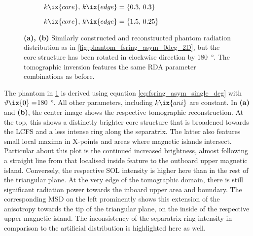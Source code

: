                 \begin{figure}[t]%
                    \centering%
                    \begin{subfigure}{\textwidth}%
                        \centering%
                        \caption{$k\ix{core},\,k\ix{edge}=\left\{0.3,\,0.3\right\}$}%
                    \end{subfigure}%
                    \newline%
                    \begin{subfigure}{\textwidth}%
                        \centering%
                        \caption{$k\ix{core},\,k\ix{edge}=\left\{1.5,\,0.25\right\}$}%
                    \end{subfigure}%
                    \caption{\textbf{(a), (b)} Similarly constructed and reconstructed phantom radiation distribution as in \cref{fig:phantom_fsring_asym_0deg_2D}, but the core structure has been rotated in clockwise direction by \SI{180}{\degree}. The tomographic inversion features the same RDA parameter combinations as before.}\label{fig:phantom_fsring_asym_180deg_2D}%
                \end{figure}%
%
                The phantom in \cref{fig:phantom_fsring_asym_180deg_2D} is derived using equation \ref{eq:fsring_asym_single_deg} with $\vartheta\ix{0}=$\SI{180}{\degree}. All other parameters, including $k\ix{ani}$ are constant. In \textbf{(a)} and \textbf{(b)}, the center image shows the respective tomographic reconstruction. At the top, this shows a distinctly brighter core structure that is broadened towards the LCFS and a less intense ring along the separatrix. The latter also features small local maxima in X-points and areas where magnetic islands intersect. Particular about this plot is the continued increased brightness, almost following a straight line from that localised inside feature to the outboard upper magnetic island. Conversely, the respective SOL intensity is higher here than in the rest of the triangular plane. At the very edge of the tomographic domain, there is still significant radiation power towards the inboard upper area and boundary. The corresponding MSD on the left prominently shows this extension of the anisotropy towards the tip of the triangular plane, on the inside of the respective upper magnetic island. The inconsistency of the separatrix ring intensity in comparison to the artificial distribution is highlighted here as well.\\%
